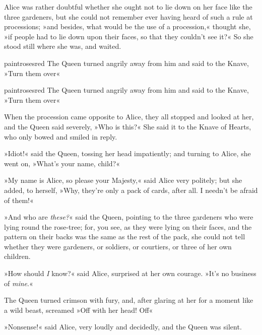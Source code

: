 Alice was rather doubtful whether she ought not to lie down on her face like the three gardeners, but she could not remember ever having heard of such a rule at processions; »and besides, what would be the use of a procession,« thought she, »if people had to lie down upon their faces, so that they couldn't see it?« So she stood still where she was, and waited.

\begin{pictures}
	\begin{letter}
		\begin{colorbigpic}
			[1.1]
			{paintrosesred}
			{The Queen turned angrily away from him and said to the Knave, »Turn them over«}
		\end{colorbigpic}
	\end{letter}
	
	\begin{a4}
		\begin{colorbigpic}
			[1.0]
			{paintrosesred}
			{The Queen turned angrily away from him and said to the Knave, »Turn them over«}
		\end{colorbigpic}
	\end{a4}	
\end{pictures}

When the procession came opposite to Alice, they all stopped and looked at her, and the Queen said severely, »Who is this?« She said it to the Knave of Hearts, who only bowed and smiled in reply.

»Idiot!« said the Queen, tossing her head impatiently; and turning to Alice, she went on, »What's your name, child?«

»My name is Alice, so please your Majesty,« said Alice very politely; but she added, to herself, »Why, they're only a pack of cards, after all. I needn't be afraid of them!«

»And who are \textit{these?}« said the Queen, pointing to the three gardeners who were lying round the rose-tree; for, you see, as they were lying on their faces, and the pattern on their backs was the same as the rest of the pack, she could not tell whether they were gardeners, or soldiers, or courtiers, or three of her own children.

»How should \textit{I} know?« said Alice, surprised at her own courage. »It's no business of \textit{mine}.«

The Queen turned crimson with fury, and, after glaring at her for a moment like a wild beast, screamed »Off with her head! Off\longdash«

»Nonsense!« said Alice, very loudly and decidedly, and the Queen was silent.

